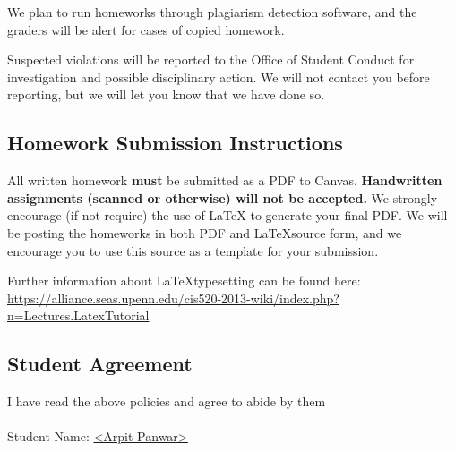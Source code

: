 \documentclass[english]{article}
\begin{document}
We plan to run homeworks through plagiarism detection software, and the graders will be alert for cases of copied homework.

Suspected violations will be reported to the Office of Student Conduct
for investigation and possible disciplinary action. We will not
contact you before reporting, but we will let you know that we have
done so.

\subsection*{Homework Submission Instructions}

All written homework {\bf must} be submitted as a PDF to Canvas. {\bf
  Handwritten assignments (scanned or otherwise) will not be
  accepted.}  We strongly encourage (if not require) the use of \LaTeX
to generate your final PDF. We will be posting the homeworks in both
PDF and \LaTeX source form, and we encourage you to use this source as
a template for your submission.

Further information about \LaTeX  typesetting can be found here: \\ {\small \url{https://alliance.seas.upenn.edu/cis520-2013-wiki/index.php?n=Lectures.LatexTutorial}}


\subsection*{Student Agreement}
I have read the above policies and agree to abide by them
\\ \\
Student Name: \underline{\textless Arpit Panwar\textgreater}
\end{document}
